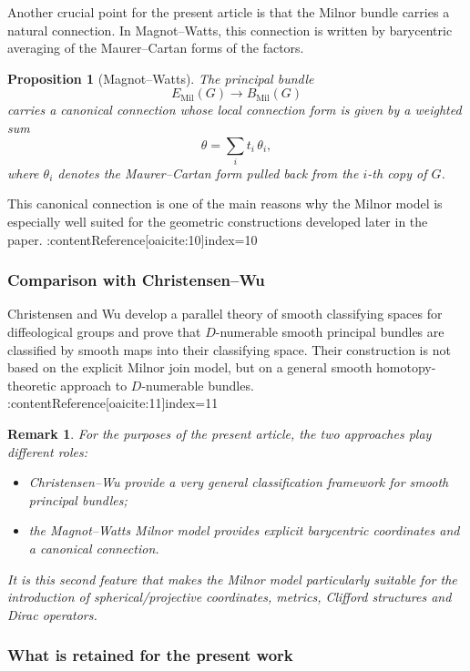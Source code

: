 \documentclass[11pt]{amsart}
\newtheorem{proposition}[theorem]{Proposition}
\newtheorem{remark}[theorem]{Remark}
\begin{document}
Another crucial point for the present article is that the Milnor bundle carries a natural connection. In Magnot--Watts, this connection is written by barycentric averaging of the Maurer--Cartan forms of the factors.

\begin{proposition}[Magnot--Watts]
The principal bundle
\[
E_{\mathrm{Mil}}(G)\to B_{\mathrm{Mil}}(G)
\]
carries a canonical connection whose local connection form is given by a weighted sum
\[
\theta=\sum_i t_i\,\theta_i,
\]
where \(\theta_i\) denotes the Maurer--Cartan form pulled back from the \(i\)-th copy of \(G\).
\end{proposition}

This canonical connection is one of the main reasons why the Milnor model is especially well suited for the geometric constructions developed later in the paper. :contentReference[oaicite:10]{index=10}

\subsubsection{Comparison with Christensen--Wu}

Christensen and Wu develop a parallel theory of smooth classifying spaces for diffeological groups and prove that \(D\)-numerable smooth principal bundles are classified by smooth maps into their classifying space. Their construction is not based on the explicit Milnor join model, but on a general smooth homotopy-theoretic approach to \(D\)-numerable bundles. :contentReference[oaicite:11]{index=11}

\begin{remark}
For the purposes of the present article, the two approaches play different roles:
\begin{itemize}
\item Christensen--Wu provide a very general classification framework for smooth principal bundles;
\item the Magnot--Watts Milnor model provides explicit barycentric coordinates and a canonical connection.
\end{itemize}
It is this second feature that makes the Milnor model particularly suitable for the introduction of spherical/projective coordinates, metrics, Clifford structures and Dirac operators.
\end{remark}

\subsubsection{What is retained for the present work}
\end{document}
